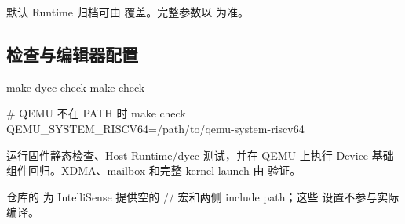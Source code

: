 \documentclass[../dayan_kernel_manual.tex]{subfiles}
\begin{document}
默认 Runtime 归档可由
 覆盖。完整参数以
 为准。

\subsection{检查与编辑器配置}

\begin{dayancode}
make dycc-check
make check

# QEMU 不在 PATH 时
make check QEMU_SYSTEM_RISCV64=/path/to/qemu-system-riscv64
\end{dayancode}

 运行固件静态检查、Host Runtime/dycc 测试，并在 QEMU 
上执行 Device 基础组件回归。XDMA、mailbox 和完整 kernel launch 由
 验证。

仓库的  为 IntelliSense 提供空的
// 宏和两侧 include path；这些
设置不参与实际编译。
\end{document}
